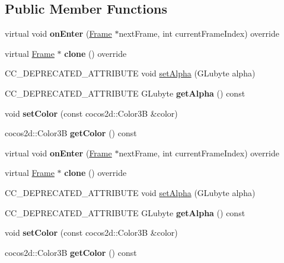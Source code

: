 \subsection*{Public Member Functions}
\begin{DoxyCompactItemize}
\item 
\mbox{\label{classColorFrame_aad58ac94f5f987264741675ffc08d37b}} 
virtual void {\bfseries on\+Enter} (\hyperlink{classFrame}{Frame} $\ast$next\+Frame, int current\+Frame\+Index) override
\item 
\mbox{\label{classColorFrame_a67d9d9aa06a9ec75bfbc4cb086f56c7e}} 
virtual \hyperlink{classFrame}{Frame} $\ast$ {\bfseries clone} () override
\item 
C\+C\+\_\+\+D\+E\+P\+R\+E\+C\+A\+T\+E\+D\+\_\+\+A\+T\+T\+R\+I\+B\+U\+TE void \hyperlink{classColorFrame_a9ff6186646bd482ba3d4fe0e242739d6}{set\+Alpha} (G\+Lubyte alpha)
\item 
\mbox{\label{classColorFrame_aaa389079ad3556f9849234a268598072}} 
C\+C\+\_\+\+D\+E\+P\+R\+E\+C\+A\+T\+E\+D\+\_\+\+A\+T\+T\+R\+I\+B\+U\+TE G\+Lubyte {\bfseries get\+Alpha} () const
\item 
\mbox{\label{classColorFrame_a83b88c324217343a07f4c9c5e55d1b4c}} 
void {\bfseries set\+Color} (const cocos2d\+::\+Color3B \&color)
\item 
\mbox{\label{classColorFrame_a4b9aada99d8da9a5663773ce8daa154f}} 
cocos2d\+::\+Color3B {\bfseries get\+Color} () const
\item 
\mbox{\label{classColorFrame_aa14ab9bad276eabf71bf0bb270aa6f64}} 
virtual void {\bfseries on\+Enter} (\hyperlink{classFrame}{Frame} $\ast$next\+Frame, int current\+Frame\+Index) override
\item 
\mbox{\label{classColorFrame_a9a17698577a542d910fa8b308cef3926}} 
virtual \hyperlink{classFrame}{Frame} $\ast$ {\bfseries clone} () override
\item 
C\+C\+\_\+\+D\+E\+P\+R\+E\+C\+A\+T\+E\+D\+\_\+\+A\+T\+T\+R\+I\+B\+U\+TE void \hyperlink{classColorFrame_a9ff6186646bd482ba3d4fe0e242739d6}{set\+Alpha} (G\+Lubyte alpha)
\item 
\mbox{\label{classColorFrame_aaa389079ad3556f9849234a268598072}} 
C\+C\+\_\+\+D\+E\+P\+R\+E\+C\+A\+T\+E\+D\+\_\+\+A\+T\+T\+R\+I\+B\+U\+TE G\+Lubyte {\bfseries get\+Alpha} () const
\item 
\mbox{\label{classColorFrame_a83b88c324217343a07f4c9c5e55d1b4c}} 
void {\bfseries set\+Color} (const cocos2d\+::\+Color3B \&color)
\item 
\mbox{\label{classColorFrame_a4b9aada99d8da9a5663773ce8daa154f}} 
cocos2d\+::\+Color3B {\bfseries get\+Color} () const
\end{DoxyCompactItemize}

